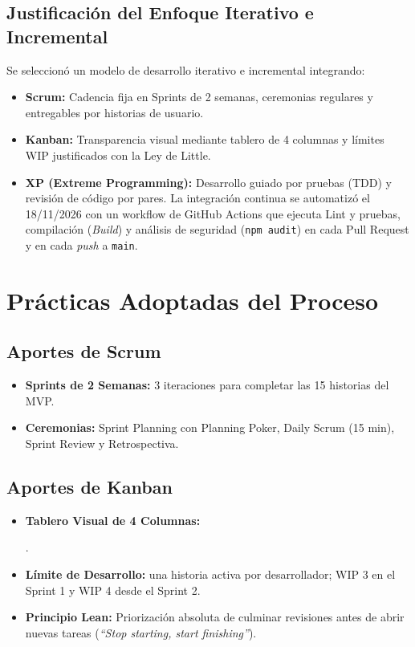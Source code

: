 \documentclass[11pt,a4paper]{article}
\begin{document}
\subsection{Justificación del Enfoque Iterativo e Incremental}
Se seleccionó un modelo de desarrollo iterativo e incremental integrando:
\begin{itemize}[leftmargin=*]
    \item \textbf{Scrum:} Cadencia fija en Sprints de 2 semanas, ceremonias regulares y entregables por historias de usuario.
    \item \textbf{Kanban:} Transparencia visual mediante tablero de 4 columnas y límites WIP justificados con la Ley de Little.
    \item \textbf{XP (Extreme Programming):} Desarrollo guiado por pruebas (TDD) y revisión de código por pares. La integración continua se automatizó el 18/11/2026 con un workflow de GitHub Actions que ejecuta Lint y pruebas, compilación (\textit{Build}) y análisis de seguridad (\texttt{npm audit}) en cada Pull Request y en cada \textit{push} a \texttt{main}.
\end{itemize}

\section{Prácticas Adoptadas del Proceso}
\subsection{Aportes de Scrum}
\begin{itemize}[leftmargin=*]
    \item \textbf{Sprints de 2 Semanas:} 3 iteraciones para completar las 15 historias del MVP.
    \item \textbf{Ceremonias:} Sprint Planning con Planning Poker, Daily Scrum (15 min), Sprint Review y Retrospectiva.
\end{itemize}

\subsection{Aportes de Kanban}
\begin{itemize}[leftmargin=*]
    \item \textbf{Tablero Visual de 4 Columnas:}\par
    \noindent{}.
    \item \textbf{Límite de Desarrollo:} una historia activa por desarrollador; WIP 3 en el Sprint 1 y WIP 4 desde el Sprint 2.
    \item \textbf{Principio Lean:} Priorización absoluta de culminar revisiones antes de abrir nuevas tareas (\textit{``Stop starting, start finishing''}).
\end{itemize}
\end{document}
